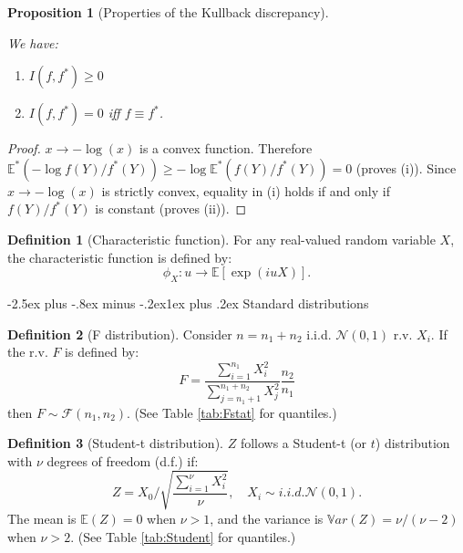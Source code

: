 \documentclass[
  11pt,
]{book}
\makeatletter
\providecommand{\tightlist}{%
  \setlength{\itemsep}{0pt}\setlength{\parskip}{0pt}}
\renewcommand\subsection{\@startsection{subsection}{2}{\z@}
  {-2.5ex plus -.8ex minus -.2ex}{1ex plus .2ex}
  {\normalfont\large\bfseries\color{TextbookInk}}}
\newtheorem{proposition}{Proposition}[chapter]
\theoremstyle{definition}
\newtheorem{definition}{Definition}[chapter]
\theoremstyle{definition}
\theoremstyle{definition}
\theoremstyle{definition}
\theoremstyle{remark}
\makeatother
\begin{document}
\begin{proposition}[Properties of the Kullback discrepancy]
\protect\hypertarget{prp:Kullback-properties}{}\label{prp:Kullback-properties}

We have:

\begin{enumerate}
\def\labelenumi{\roman{enumi}.}
\tightlist
\item
  \(I(f,f^*) \ge 0\)
\item
  \(I(f,f^*) = 0\) iff \(f \equiv f^*\).
\end{enumerate}

\end{proposition}

\begin{proof}
\(x \rightarrow -\log(x)\) is a convex function. Therefore \(\mathbb{E}^*(-\log f(Y)/f^*(Y)) \ge -\log \mathbb{E}^*(f(Y)/f^*(Y)) = 0\) (proves (i)). Since \(x \rightarrow -\log(x)\) is strictly convex, equality in (i) holds if and only if \(f(Y)/f^*(Y)\) is constant (proves (ii)).
\end{proof}

\begin{definition}[Characteristic function]
\protect\hypertarget{def:characteristic}{}\label{def:characteristic}For any real-valued random variable \(X\), the characteristic function is defined by:
\[
\phi_X: u \rightarrow \mathbb{E}[\exp(iuX)].
\]
\end{definition}

\subsection{Standard distributions}\label{standard-distributions}

\begin{definition}[F distribution]
\protect\hypertarget{def:fstatistics}{}\label{def:fstatistics}Consider \(n=n_1+n_2\) i.i.d. \(\mathcal{N}(0,1)\) r.v. \(X_i\). If the r.v. \(F\) is defined by:
\[
F = \frac{\sum_{i=1}^{n_1} X_i^2}{\sum_{j=n_1+1}^{n_1+n_2} X_j^2}\frac{n_2}{n_1}
\]
then \(F \sim \mathcal{F}(n_1,n_2)\). (See Table \ref{tab:Fstat} for quantiles.)
\end{definition}

\begin{definition}[Student-t distribution]
\protect\hypertarget{def:tStudent}{}\label{def:tStudent}\(Z\) follows a Student-t (or \(t\)) distribution with \(\nu\) degrees of freedom (d.f.) if:
\[
Z = X_0 \bigg/ \sqrt{\frac{\sum_{i=1}^{\nu}X_i^2}{\nu}}, \quad X_i \sim i.i.d. \mathcal{N}(0,1).
\]
The mean is \(\mathbb{E}(Z)=0\) when \(\nu>1\), and the variance is \(\mathbb{V}ar(Z)=\nu/(\nu-2)\) when \(\nu>2\). (See Table \ref{tab:Student} for quantiles.)
\end{definition}
\end{document}
